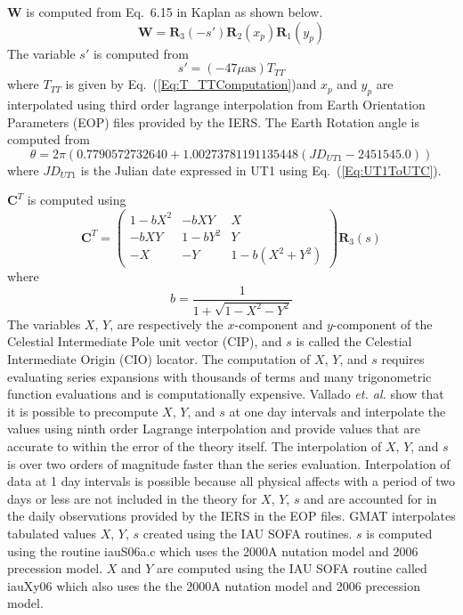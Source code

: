$\mathbf{W}$ is computed from
Eq.~6.15 in Kaplan\cite{Kaplan:05} as shown below.
%
\begin{equation}
   \mathbf{W} = \mathbf{R}_3(-s')\mathbf{R}_2(x_p)\mathbf{R}_1(y_p)
\end{equation}
%
The variable $s'$ is computed from
%
\begin{equation}
    s' =  (-47 \mu\mbox{as}) T_{TT}
\end{equation}
%
where $T_{TT}$ is given by Eq.~(\ref{Eq:T_TTComputation})and $x_p$ and $y_p$ are interpolated using third order lagrange interpolation from Earth Orientation Parameters (EOP) files provided by the IERS. The Earth Rotation angle is computed from
%
\begin{equation}
    \theta = 2\pi(0.7790572732640 + 1.00273781191135448(JD_{UT1} - 2451545.0))
\end{equation}
%
where $JD_{UT1}$ is the Julian date expressed in UT1 using Eq.~(\ref{Eq:UT1ToUTC}).

$\mathbf{C}^T$ is computed using
%
\begin{equation}
    \mathbf{C}^T = \left(\begin{array}{ccc}
    1 - b X^2 & -b X Y & X\\
    -b X Y & 1-b Y^2 & Y\\
    -X & -Y & 1 - b(X^2 + Y^2)
    \end{array}\right) \mathbf{R}_{3}(s)
\end{equation}
%
where
%
\begin{equation}
    b = \frac{1}{1 + \sqrt{1 - X^2 - Y^2}}
\end{equation}
%
The variables $X$, $Y$, are respectively the $x$-component and $y$-component of the Celestial Intermediate
Pole unit vector (CIP), and $s$ is called the Celestial Intermediate Origin (CIO) locator. The computation of $X$, $Y$, and $s$ requires evaluating series expansions with thousands of terms and many trigonometric function evaluations and is computationally expensive.  Vallado \emph{et. al.} show that it is possible to precompute $X$, $Y$, and $s$ at one day intervals and interpolate the values using ninth order Lagrange interpolation and provide values that are accurate to within the error of the theory itself.  The interpolation of $X$, $Y$, and $s$ is over two orders of magnitude faster than the series evaluation.  Interpolation of data at 1 day intervals is possible because all physical affects with a period of two days or less are not included in the theory for $X$, $Y$,
$s$ and are accounted for in the daily observations provided by the IERS in the EOP files\cite{Kaplan:05}.  GMAT interpolates tabulated values $X$, $Y$, $s$ created using the IAU SOFA routines.  $s$ is computed using the routine iauS06a.c which uses the 2000A nutation model and 2006 precession model.  $X$ and $Y$ are computed using the IAU SOFA routine called iauXy06 which also uses the the 2000A nutation model and 2006 precession model.


